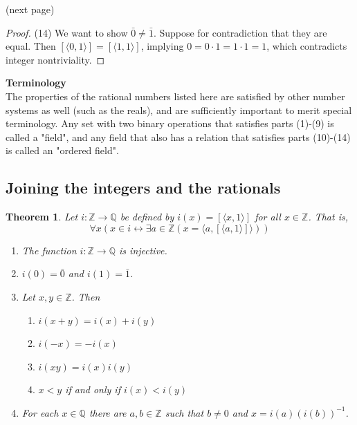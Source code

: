 \documentclass{report}
\newtheorem{theorem}[theo]{Theorem}
\begin{document}
\noindent(next page)\newpage
\begin{proof}(14)
We want to show $\bar0\neq\bar1$. Suppose for contradiction that they are equal. Then $[\langle 0,1\rangle]=[\langle 1,1\rangle]$, implying $0=0\cdot1=1\cdot1=1$, 
which contradicts integer nontriviality.
\end{proof}
\noindent\textbf{Terminology}\\
The properties of the rational numbers listed here are satisfied by other number systems as well (such as the reals), and are sufficiently important to merit special terminology. Any set with
two binary operations that satisfies parts (1)-(9) is called a "field", and any field that also has a relation that satisfies parts (10)-(14) is called an "ordered field".
\newpage

\subsection{Joining the integers and the rationals}
\begin{theorem}\label{Z_Q_embedding}
Let $i:\mathbb Z\to\mathbb Q$ be defined by $i(x)=[\langle x,1\rangle]$ for all $x\in\mathbb Z$. That is,
\begin{equation*}
\forall x(x\in i\leftrightarrow\exists a\in\mathbb Z(x=\langle a,[\langle a,1\rangle]\rangle))
\end{equation*}
\begin{enumerate}
\item The function $i:\mathbb Z\to\mathbb Q$ is injective.
\item $i(0)=\bar0$ and $i(1)=\bar1$.
\item Let $x,y\in\mathbb Z$. Then
\begin{enumerate}
\item $i(x+y)=i(x)+i(y)$
\item $i(-x)=-i(x)$
\item $i(xy)=i(x)i(y)$
\item $x<y$ if and only if $i(x)<i(y)$
\end{enumerate}
\item For each $x\in\mathbb Q$ there are $a,b\in\mathbb Z$ such that $b\neq0$ and $x=i(a)(i(b))^{-1}$.
\end{enumerate}
\end{theorem}
\end{document}
